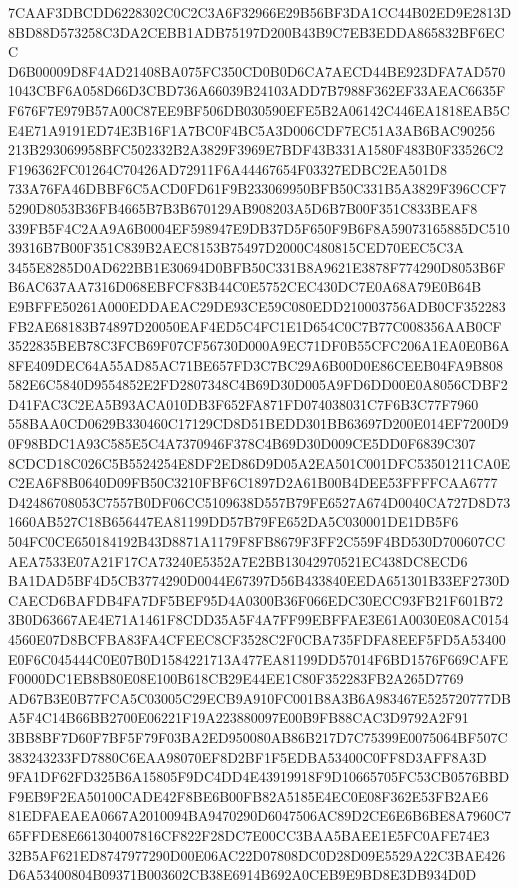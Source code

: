 \documentclass[UTF8,fontset=fandol,zihao=-4,a4paper]{ctexart}
\begin{document}
{{7CAAF3DBCDD6228302C0C2C3A6F32966E29B56BF3DA1CC44B02ED9E2813D8BD88D573258C3DA2CEBB1ADB75197D200B43B9C7EB3EDDA865832BF6ECC
D6B00009D8F4AD21408BA075FC350CD0B0D6CA7AECD44BE923DFA7AD5701043CBF6A058D66D3CBD736A66039B24103ADD7B7988F362EF33AEAC6635F
F676F7E979B57A00C87EE9BF506DB030590EFE5B2A06142C446EA1818EAB5CE4E71A9191ED74E3B16F1A7BC0F4BC5A3D006CDF7EC51A3AB6BAC90256
213B293069958BFC502332B2A3829F3969E7BDF43B331A1580F483B0F33526C2F196362FC01264C70426AD72911F6A44467654F03327EDBC2EA501D8
733A76FA46DBBF6C5ACD0FD61F9B233069950BFB50C331B5A3829F396CCF75290D8053B36FB4665B7B3B670129AB908203A5D6B7B00F351C833BEAF8
339FB5F4C2AA9A6B0004EF598947E9DB37D5F650F9B6F8A59073165885DC51039316B7B00F351C839B2AEC8153B75497D2000C480815CED70EEC5C3A
3455E8285D0AD622BB1E30694D0BFB50C331B8A9621E3878F774290D8053B6FB6AC637AA7316D068EBFCF83B44C0E5752CEC430DC7E0A68A79E0B64B
E9BFFE50261A000EDDAEAC29DE93CE59C080EDD210003756ADB0CF352283FB2AE68183B74897D20050EAF4ED5C4FC1E1D654C0C7B77C008356AAB0CF
3522835BEB78C3FCB69F07CF56730D000A9EC71DF0B55CFC206A1EA0E0B6A8FE409DEC64A55AD85AC71BE657FD3C7BC29A6B00D0E86CEEB04FA9B808
582E6C5840D9554852E2FD2807348C4B69D30D005A9FD6DD00E0A8056CDBF2D41FAC3C2EA5B93ACA010DB3F652FA871FD074038031C7F6B3C77F7960
558BAA0CD0629B330460C17129CD8D51BEDD301BB63697D200E014EF7200D90F98BDC1A93C585E5C4A7370946F378C4B69D30D009CE5DD0F6839C307
8CDCD18C026C5B5524254E8DF2ED86D9D05A2EA501C001DFC53501211CA0EC2EA6F8B0640D09FB50C3210FBF6C1897D2A61B00B4DEE53FFFFCAA6777
D42486708053C7557B0DF06CC5109638D557B79FE6527A674D0040CA727D8D731660AB527C18B656447EA81199DD57B79FE652DA5C030001DE1DB5F6
504FC0CE650184192B43D8871A1179F8FB8679F3FF2C559F4BD530D700607CCAEA7533E07A21F17CA73240E5352A7E2BB13042970521EC438DC8ECD6
BA1DAD5BF4D5CB3774290D0044E67397D56B433840EEDA651301B33EF2730DCAECD6BAFDB4FA7DF5BEF95D4A0300B36F066EDC30ECC93FB21F601B72
3B0D63667AE4E71A1461F8CDD35A5F4A7FF99EBFFAE3E61A0030E08AC01544560E07D8BCFBA83FA4CFEEC8CF3528C2F0CBA735FDFA8EEF5FD5A53400
E0F6C045444C0E07B0D1584221713A477EA81199DD57014F6BD1576F669CAFEF0000DC1EB8B80E08E100B618CB29E44EE1C80F352283FB2A265D7769
AD67B3E0B77FCA5C03005C29ECB9A910FC001B8A3B6A983467E525720777DBA5F4C14B66BB2700E06221F19A223880097E00B9FB88CAC3D9792A2F91
3BB8BF7D60F7BF5F79F03BA2ED950080AB86B217D7C75399E0075064BF507C383243233FD7880C6EAA98070EF8D2BF1F5EDBA53400C0FF8D3AFF8A3D
9FA1DF62FD325B6A15805F9DC4DD4E43919918F9D10665705FC53CB0576BBDF9EB9F2EA50100CADE42F8BE6B00FB82A5185E4EC0E08F362E53FB2AE6
81EDFAEAEA0667A2010094BA9470290D6047506AC89D2CE6E6B6BE8A7960C765FFDE8E661304007816CF822F28DC7E00CC3BAA5BAEE1E5FC0AFE74E3
32B5AF621ED8747977290D00E06AC22D07808DC0D28D09E5529A22C3BAE426D6A53400804B09371B003602CB38E6914B692A0CEB9E9BD8E3DB934D0D
}}
\end{document}
